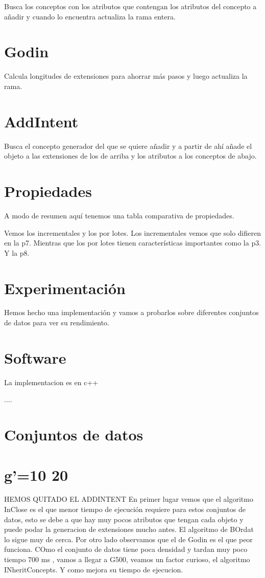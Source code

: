 \documentclass{article}
\begin{document}
Busca los conceptos con los atributos que contengan los atributos del concepto a añadir y cuando lo encuentra actualiza la rama entera.

\section{Godin}
Calcula longitudes de extensiones para ahorrar más pasos y luego actualiza la rama.

\section{AddIntent}

Busca el concepto generador del que se quiere añadir y a partir de ahí añade el objeto a las extensiones de los de arriba y los atributos a los conceptos de abajo.

\section{Propiedades}

A modo de resumen aquí tenemos una tabla comparativa de propiedades.

Vemos los incrementales y los por lotes. Los incrementales vemos que solo difieren en la p7. 
Mientras que los por lotes tienen características importantes como la p3. Y la p8.

\section{Experimentación}

Hemos hecho una implementación y vamos a probarlos sobre diferentes conjuntos de datos para ver su rendimiento.


\section{Software}

La implementacion es en c++

....
\section{Conjuntos de datos}

\section{g'=10 20}
HEMOS QUITADO EL ADDINTENT
En primer lugar vemos que el algoritmo InClose es el que menor tiempo de ejecución requiere para estos conjuntos de datos, esto se debe a que hay muy pocos atributos que tengan cada objeto y puede podar la generacion de extensiones mucho antes. El algoritmo de BOrdat lo sigue muy de cerca. Por otro lado observamos que el de Godin es el que peor funciona. COmo el conjunto de datos tiene poca densidad y tardan muy poco tiempo 700 ms , vamos a llegar a G500, veamos un factor curioso, el algoritmo INheritConcepts. Y como mejora su tiempo de ejecucion.
\end{document}
